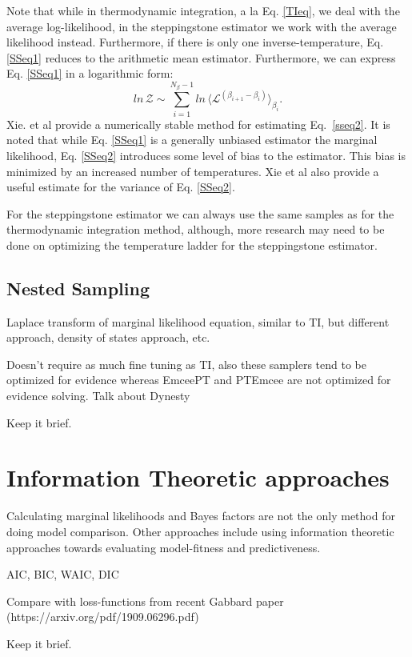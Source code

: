 Note that while in thermodynamic integration, a la Eq. \ref{TIeq}, we deal with the average log-likelihood, in the steppingstone estimator we work with the average likelihood instead. Furthermore, if there is only one inverse-temperature, Eq. \ref{SSeq1} reduces to the arithmetic mean estimator. Furthermore, we can express Eq. \ref{SSeq1} in a logarithmic form:
\begin{equation}\label{SSeq2}
    ln \, \mathcal{Z} \sim \sum_{i=1}^{N_\beta -1} ln \, \langle \mathcal{L}^{\left(\beta_{i+1} - \beta_{i}\right)}\rangle_{\beta_i}.
\end{equation}
Xie. et al provide a numerically stable method for estimating Eq.~\ref{sseq2}. It is noted that while Eq. \ref{SSeq1} is a generally unbiased estimator the marginal likelihood, Eq. \ref{SSeq2} introduces some level of bias to the estimator. This bias is minimized by an increased number of temperatures. Xie et al also provide a useful estimate for the variance of Eq. \ref{SSeq2}.

For the steppingstone estimator we can always use the same samples as for the thermodynamic integration method, although, more research may need to be done on optimizing the temperature ladder for the steppingstone estimator.
\subsection{Nested Sampling}
Laplace transform of marginal likelihood equation, similar to TI, but different approach, density of states approach, etc.

Doesn't require as much fine tuning as TI, also these samplers tend to be optimized for evidence whereas EmceePT and PTEmcee are not optimized for evidence solving. Talk about Dynesty

Keep it brief.

\section{Information Theoretic approaches}
Calculating marginal likelihoods and Bayes factors are not the only method for doing model comparison. Other approaches include using information theoretic approaches towards evaluating model-fitness and predictiveness.

AIC, BIC, WAIC, DIC

Compare with loss-functions from recent Gabbard paper (https://arxiv.org/pdf/1909.06296.pdf)

Keep it brief.
